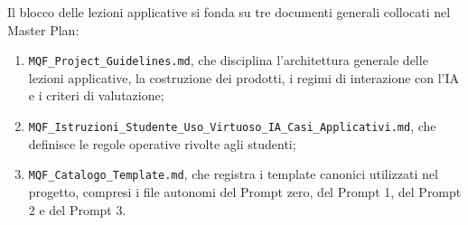 \documentclass[12pt,a4paper]{article}%
\newcommand{\1}{\mathbf{1}}
\begin{document}
Il blocco delle lezioni applicative si fonda su tre documenti generali
collocati nel Master Plan:
\begin{enumerate}
\item \texttt{MQF\_Project\_Guidelines.md}, che disciplina l'architettura
generale delle lezioni applicative, la costruzione dei prodotti, i regimi di
interazione con l'IA e i criteri di valutazione;

\item
\texttt{MQF\_Istruzioni\_Studente\_Uso\_Virtuoso\_IA\_Casi\_Applicativi.md},
che definisce le regole operative rivolte agli studenti;

\item \texttt{MQF\_Catalogo\_Template.md}, che registra i template canonici
utilizzati nel progetto, compresi i file autonomi del Prompt zero, del Prompt
1, del Prompt 2 e del Prompt 3.
\end{enumerate}
\end{document}
